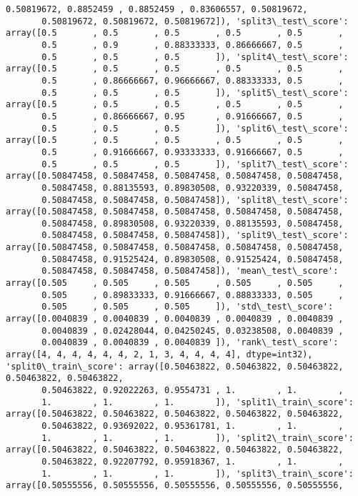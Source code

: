 \documentclass[11pt]{article}
\begin{document}
\begin{Verbatim}[commandchars=\\\{\}]
       0.50819672, 0.8852459 , 0.8852459 , 0.83606557, 0.50819672,
       0.50819672, 0.50819672, 0.50819672]), 'split3\_test\_score': array([0.5       , 0.5       , 0.5       , 0.5       , 0.5       ,
       0.5       , 0.9       , 0.88333333, 0.86666667, 0.5       ,
       0.5       , 0.5       , 0.5       ]), 'split4\_test\_score': array([0.5       , 0.5       , 0.5       , 0.5       , 0.5       ,
       0.5       , 0.86666667, 0.96666667, 0.88333333, 0.5       ,
       0.5       , 0.5       , 0.5       ]), 'split5\_test\_score': array([0.5       , 0.5       , 0.5       , 0.5       , 0.5       ,
       0.5       , 0.86666667, 0.95      , 0.91666667, 0.5       ,
       0.5       , 0.5       , 0.5       ]), 'split6\_test\_score': array([0.5       , 0.5       , 0.5       , 0.5       , 0.5       ,
       0.5       , 0.91666667, 0.93333333, 0.91666667, 0.5       ,
       0.5       , 0.5       , 0.5       ]), 'split7\_test\_score': array([0.50847458, 0.50847458, 0.50847458, 0.50847458, 0.50847458,
       0.50847458, 0.88135593, 0.89830508, 0.93220339, 0.50847458,
       0.50847458, 0.50847458, 0.50847458]), 'split8\_test\_score': array([0.50847458, 0.50847458, 0.50847458, 0.50847458, 0.50847458,
       0.50847458, 0.89830508, 0.93220339, 0.88135593, 0.50847458,
       0.50847458, 0.50847458, 0.50847458]), 'split9\_test\_score': array([0.50847458, 0.50847458, 0.50847458, 0.50847458, 0.50847458,
       0.50847458, 0.91525424, 0.89830508, 0.91525424, 0.50847458,
       0.50847458, 0.50847458, 0.50847458]), 'mean\_test\_score': array([0.505     , 0.505     , 0.505     , 0.505     , 0.505     ,
       0.505     , 0.89833333, 0.91666667, 0.88833333, 0.505     ,
       0.505     , 0.505     , 0.505     ]), 'std\_test\_score': array([0.0040839 , 0.0040839 , 0.0040839 , 0.0040839 , 0.0040839 ,
       0.0040839 , 0.02428044, 0.04250245, 0.03238508, 0.0040839 ,
       0.0040839 , 0.0040839 , 0.0040839 ]), 'rank\_test\_score': array([4, 4, 4, 4, 4, 4, 2, 1, 3, 4, 4, 4, 4], dtype=int32), 'split0\_train\_score': array([0.50463822, 0.50463822, 0.50463822, 0.50463822, 0.50463822,
       0.50463822, 0.92022263, 0.9554731 , 1.        , 1.        ,
       1.        , 1.        , 1.        ]), 'split1\_train\_score': array([0.50463822, 0.50463822, 0.50463822, 0.50463822, 0.50463822,
       0.50463822, 0.93692022, 0.95361781, 1.        , 1.        ,
       1.        , 1.        , 1.        ]), 'split2\_train\_score': array([0.50463822, 0.50463822, 0.50463822, 0.50463822, 0.50463822,
       0.50463822, 0.92207792, 0.95918367, 1.        , 1.        ,
       1.        , 1.        , 1.        ]), 'split3\_train\_score': array([0.50555556, 0.50555556, 0.50555556, 0.50555556, 0.50555556,

\end{Verbatim}
\end{document}
